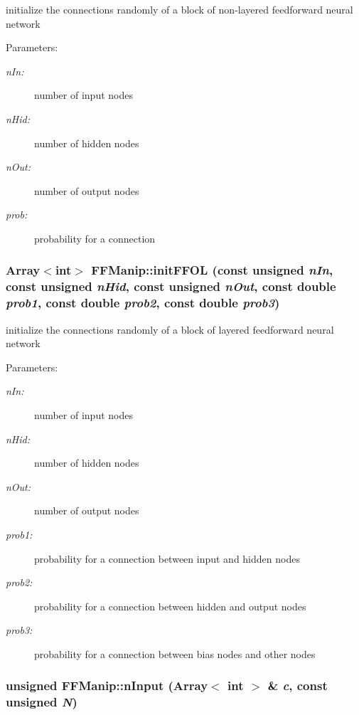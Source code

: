 initialize the connections randomly of a block of non-layered feedforward neural network

\begin{Desc}
\item[Parameters: ]\par
\begin{description}
\item[{\em 
n\-In:}]number of input nodes \item[{\em 
n\-Hid:}]number of hidden nodes \item[{\em 
n\-Out:}]number of output nodes \item[{\em 
prob:}]probability for a connection \end{description}
\end{Desc}
\subsubsection{\setlength{\rightskip}{0pt plus 5cm}Array$<$int$>$ FFManip::init\-FFOL (const unsigned {\em n\-In}, const unsigned {\em n\-Hid}, const unsigned {\em n\-Out}, const double {\em prob1}, const double {\em prob2}, const double {\em prob3})\hspace{0.3cm}{\tt  [protected]}}\label{classFFManip_b1}


initialize the connections randomly of a block of layered feedforward neural network

\begin{Desc}
\item[Parameters: ]\par
\begin{description}
\item[{\em 
n\-In:}]number of input nodes \item[{\em 
n\-Hid:}]number of hidden nodes \item[{\em 
n\-Out:}]number of output nodes \item[{\em 
prob1:}]probability for a connection between input and hidden nodes \item[{\em 
prob2:}]probability for a connection between hidden and output nodes \item[{\em 
prob3:}]probability for a connection between bias nodes and other nodes \end{description}
\end{Desc}
\subsubsection{\setlength{\rightskip}{0pt plus 5cm}unsigned FFManip::n\-Input (Array$<$ int $>$ \& {\em c}, const unsigned {\em N})\hspace{0.3cm}{\tt  [protected]}}\label{classFFManip_b8}


